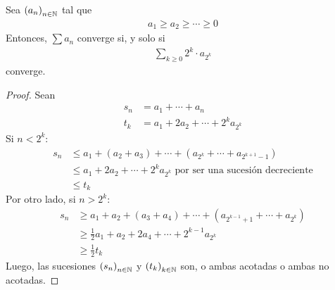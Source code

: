 \begin{theorem}
  Sea \( {(a_n)}_{n \in \mathbb{N}} \) tal que\begin{align*}
    a_1 \geq a_2 \geq \cdots \geq 0
  \end{align*}
  Entonces, \( \sum a_n \) converge si, y solo si\begin{align*}
    \sum_{k \geq 0} 2^k \cdot a_{2^k}
  \end{align*}
  converge.
  \begin{proof}
    Sean\begin{align*}
      s_n & = a_1 + \cdots + a_n                \\
      t_k & = a_1 + 2a_2 + \cdots + 2^k a_{2^k}
    \end{align*}
    Si \( n < 2^k \):\begin{align*}
      s_n & \leq a_1 + (a_2 + a_3) + \cdots + (a_{2^k} + \cdots + a_{2^{k+1}-1})              \\
          & \leq a_1 + 2a_2 + \cdots + 2^{k} a_{2^k} \text{ por ser una sucesión decreciente} \\
          & \leq t_k
    \end{align*}
    Por otro lado, si \( n > 2^k \):\begin{align*}
      s_n & \geq a_1 + a_2 + (a_3 + a_4) + \cdots + (a_{2^{k-1}+1} + \cdots + a_{2^k}) \\
          & \geq \frac{1}{2} a_1 + a_2 + 2 a_4 + \cdots + 2^{k-1} a_{2^k}              \\
          & \geq \frac{1}{2} t_k
    \end{align*}
    Luego, las sucesiones \( {(s_n)}_{n \in \mathbb{N}} \) y \( {(t_k)}_{k \in \mathbb{N}} \) son, o ambas acotadas o ambas no acotadas.
  \end{proof}
\end{theorem}
